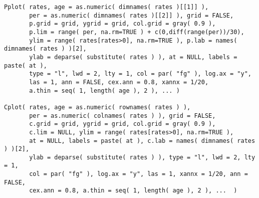 \begin{Usage}
\begin{verbatim}
Pplot( rates, age = as.numeric( dimnames( rates )[[1]] ),
       per = as.numeric( dimnames( rates )[[2]] ), grid = FALSE,
       p.grid = grid, ygrid = grid, col.grid = gray( 0.9 ),
       p.lim = range( per, na.rm=TRUE ) + c(0,diff(range(per))/30),
       ylim = range( rates[rates>0], na.rm=TRUE ), p.lab = names( dimnames( rates ) )[2],
       ylab = deparse( substitute( rates ) ), at = NULL, labels = paste( at ),
       type = "l", lwd = 2, lty = 1, col = par( "fg" ), log.ax = "y",
       las = 1, ann = FALSE, cex.ann = 0.8, xannx = 1/20,
       a.thin = seq( 1, length( age ), 2 ), ... )

Cplot( rates, age = as.numeric( rownames( rates ) ),
       per = as.numeric( colnames( rates ) ), grid = FALSE,
       c.grid = grid, ygrid = grid, col.grid = gray( 0.9 ),
       c.lim = NULL, ylim = range( rates[rates>0], na.rm=TRUE ),
       at = NULL, labels = paste( at ), c.lab = names( dimnames( rates ) )[2],
       ylab = deparse( substitute( rates ) ), type = "l", lwd = 2, lty = 1,
       col = par( "fg" ), log.ax = "y", las = 1, xannx = 1/20, ann = FALSE,
       cex.ann = 0.8, a.thin = seq( 1, length( age ), 2 ), ...  )

\end{verbatim}
\end{Usage}
